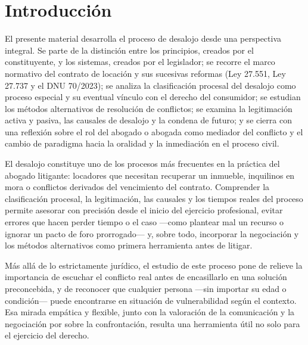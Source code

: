 \documentclass[12pt,oneside]{book}
\begin{document}
\chapter*{Introducción}

El presente material desarrolla el proceso de desalojo desde una perspectiva integral. Se parte de la distinción entre los principios, creados por el constituyente, y los sistemas, creados por el legislador; se recorre el marco normativo del contrato de locación y sus sucesivas reformas (Ley 27.551, Ley 27.737 y el DNU 70/2023); se analiza la clasificación procesal del desalojo como proceso especial y su eventual vínculo con el derecho del consumidor; se estudian los métodos alternativos de resolución de conflictos; se examina la legitimación activa y pasiva, las causales de desalojo y la condena de futuro; y se cierra con una reflexión sobre el rol del abogado o abogada como mediador del conflicto y el cambio de paradigma hacia la oralidad y la inmediación en el proceso civil.

\begin{note}
El desalojo constituye uno de los procesos más frecuentes en la práctica del abogado litigante: locadores que necesitan recuperar un inmueble, inquilinos en mora o conflictos derivados del vencimiento del contrato. Comprender la clasificación procesal, la legitimación, las causales y los tiempos reales del proceso permite asesorar con precisión desde el inicio del ejercicio profesional, evitar errores que hacen perder tiempo o el caso —como plantear mal un recurso o ignorar un pacto de foro prorrogado— y, sobre todo, incorporar la negociación y los métodos alternativos como primera herramienta antes de litigar.
\end{note}

\begin{note}
Más allá de lo estrictamente jurídico, el estudio de este proceso pone de relieve la importancia de escuchar el conflicto real antes de encasillarlo en una solución preconcebida, y de reconocer que cualquier persona —sin importar su edad o condición— puede encontrarse en situación de vulnerabilidad según el contexto. Esa mirada empática y flexible, junto con la valoración de la comunicación y la negociación por sobre la confrontación, resulta una herramienta útil no solo para el ejercicio del derecho.
\end{note}
\end{document}
